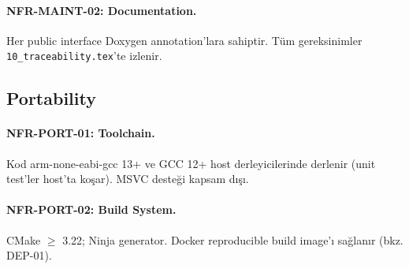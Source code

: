 \paragraph{NFR-MAINT-02: Documentation.}
Her public interface Doxygen annotation'lara sahiptir. Tüm gereksinimler \texttt{10\_traceability.tex}'te izlenir.

\subsection{Portability}

\paragraph{NFR-PORT-01: Toolchain.}
Kod arm-none-eabi-gcc 13+ ve GCC 12+ host derleyicilerinde derlenir (unit test'ler host'ta koşar). MSVC desteği kapsam dışı.

\paragraph{NFR-PORT-02: Build System.}
CMake $\geq$ 3.22; Ninja generator. Docker reproducible build image'ı sağlanır (bkz. DEP-01).
